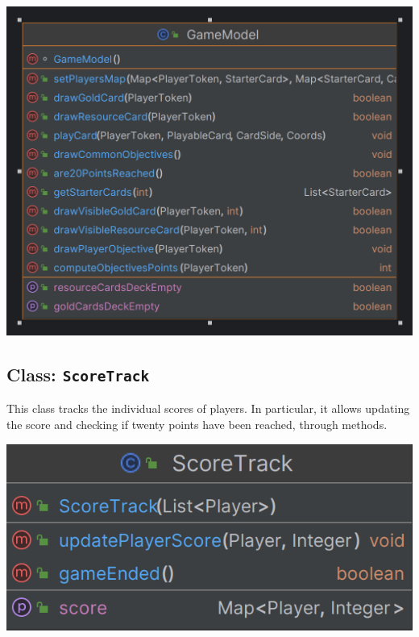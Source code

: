 \documentclass{article}
\begin{document}
\begin{center}
    \includegraphics[scale=0.25]{GameModel.png}
\end{center}

\newpage
\subsection{Class: \texttt{ScoreTrack}}
This class tracks the individual scores of players.
In particular, it allows updating the score and checking if twenty points have been reached, through methods.

\begin{center}
    \includegraphics[scale=0.5]{ScoreTrack.png}
\end{center}
\newpage
\end{document}
